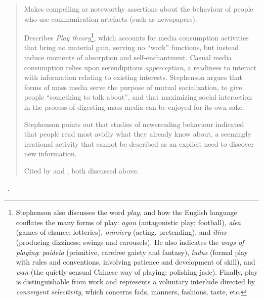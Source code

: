 \begin{quotation}
    Makes compelling or noteworthy assertions about the behaviour of people who use communication artefacts (such as newspapers).
    
    Describes {\it Play theory}\footnote{Stephenson also discusses the word {\it play}, and how the English language conflates the many forms of play: {\it agon} (antagonistic play; \eg football), {\it alea} (games of chance; \eg lotteries), {\it mimicry} (acting, pretending), and {\it ilinx} (producing dizziness; \eg swings and carousels). He also indicates the {\it ways of playing}: {\it paideia} (primitive, carefree gaiety and fantasy), {\it ludus} (formal play with rules and conventions, involving patience and development of skill), and {\it wan} (the quietly sensual Chinese way of playing; \eg polishing jade). Finally, play is distinguishable from work and represents a voluntary interlude directed by {\it convergent selectivity}, which concerns fads, manners, fashions, taste, etc.}, which accounts for media consumption activities that bring no material gain, serving no ``work'' functions, but instead induce moments of absorption and self-enchantment.
    Casual media consumption relies upon serendipitous {\it apperception}, a readiness to interact with information relating to existing interests.
    Stephenson argues that forms of mass media serve the purpose of mutual socialization, to give people ``something to talk about'', and that maximizing social interaction in the process of digesting mass media can be enjoyed for its own sake.
    
    Stephenson points out that studies of newsreading behaviour indicated that people read most avidly what they already know about, a seemingly irrational activity that cannot be described as an explicit need to discover new information.
    
    Cited by \citet{Case2008} and \citet{Toms2000}, both discussed above.
\end{quotation}

\begin{sloppypar}
~\cite{Liu2010}. \end{sloppypar}

